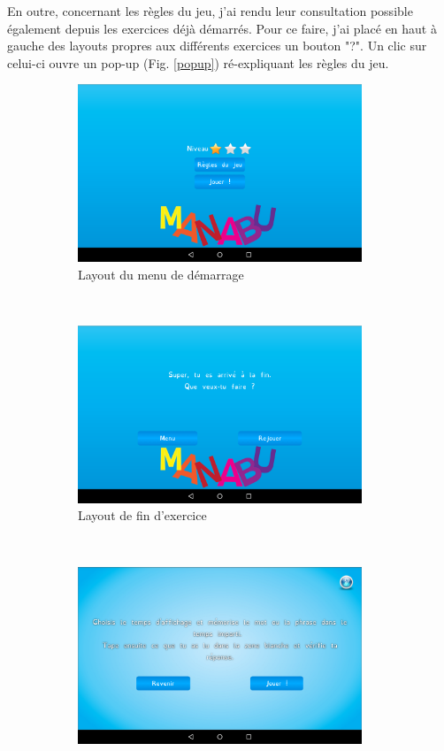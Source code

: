 En outre, concernant les règles du jeu, j'ai rendu leur consultation possible également depuis les exercices déjà démarrés. Pour ce faire, j'ai placé en haut à gauche des layouts propres aux différents exercices un bouton "?". Un clic sur celui-ci ouvre un pop-up (Fig. \ref{popup}) ré-expliquant les règles du jeu.\\

\begin{figure}[H]
\centering
\begin{subfigure}[t]{8.5cm}
\includegraphics[width=8.5cm]{img/layout-debut.png}
\caption{Layout du menu de démarrage}
\label{dem}
\end{subfigure}
~
\begin{subfigure}[t]{8.5cm}
\includegraphics[width=8.5cm]{img/layout-fin.png}
\caption{Layout de fin d'exercice}
\label{fin}
\end{subfigure}
~
\begin{subfigure}[t]{8.5cm}
\includegraphics[width=8.5cm]{img/layout-regles.png}

\end{subfigure}
\end{figure}
